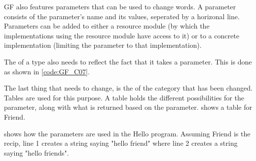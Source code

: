 
GF also features parameters that can be used to change words. A parameter consists of the parameter's name and its values, seperated by a horizonal line. Parameters can be added to either a resource module (by which the implementations using the resource module have access to it) or to a concrete implementation (limiting the parameter to that implementation).


The  of a type also needs to reflect the fact that it takes a parameter. This is done as shown in \ref{code:GF_C07}.


The last thing that needs to change, is the  of the category that has been changed. Tables are used for this purpose. A table holds the different possibilities for the parameter, along with what is returned based on the parameter.  shows a table for Friend.


 shows how the parameters are used in the Hello program. Assuming Friend is the recip, line 1 creates a string saying "hello friend" where line 2 creates a string saying "hello friends".



%    
